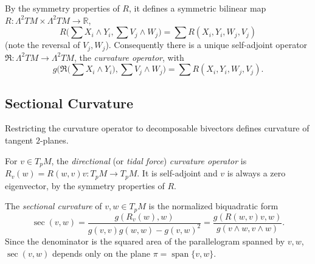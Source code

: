 \begin{definition}
  \label{def:pet-ch3-curvature-operator}


  By the symmetry properties of $R$, it defines a symmetric bilinear map
  $R:\Lambda^2TM\times\Lambda^2TM\to\mathbb R$,
  \[
    R\Big(\sum X_i\wedge Y_i,\sum V_j\wedge W_j\Big)=\sum R(X_i,Y_i,W_j,V_j)
  \]
  (note the reversal of $V_j,W_j$). Consequently there is a unique self-adjoint
  operator $\mathfrak R:\Lambda^2TM\to\Lambda^2TM$, the \emph{curvature operator},
  with
  \[
    g\Big(\mathfrak R\Big(\sum X_i\wedge Y_i\Big),\sum V_j\wedge W_j\Big)
    =\sum R(X_i,Y_i,W_j,V_j).
  \]
\end{definition}

\subsection{Sectional Curvature}

Restricting the curvature operator to decomposable bivectors defines curvature
of tangent $2$-planes.

\begin{definition}
  \label{def:pet-ch3-directional-curvature-operator}


  For $v\in T_pM$, the \emph{directional} (or \emph{tidal force}) \emph{curvature
  operator} is $R_v(w)=R(w,v)v:T_pM\to T_pM$. It is self-adjoint and $v$ is always
  a zero eigenvector, by the symmetry properties of $R$.
\end{definition}

\begin{definition}
  \label{def:pet-ch3-sectional-curvature}


  The \emph{sectional curvature} of $v,w\in T_pM$ is the normalized biquadratic form
  \[
    \sec(v,w)=\frac{g(R_v(w),w)}{g(v,v)g(w,w)-g(v,w)^2}
    =\frac{g(R(w,v)v,w)}{g(v\wedge w,v\wedge w)}.
  \]
  Since the denominator is the squared area of the parallelogram spanned by
  $v,w$, $\sec(v,w)$ depends only on the plane $\pi=\operatorname{span}\{v,w\}$.
\end{definition}

